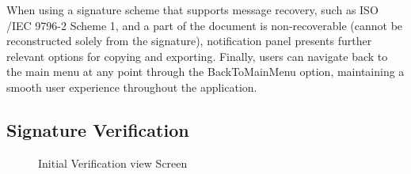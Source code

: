 \documentclass[]{final_report}
\theoremstyle{definition}
\begin{document}
When using a signature scheme that supports message recovery, such as ISO \slash IEC 9796-2 Scheme 1, and a part of the document is non-recoverable (cannot be reconstructed solely from the signature), notification panel presents further relevant options for copying and exporting.
Finally, users can navigate back to the main menu at any point through the BackToMainMenu option, maintaining a smooth user experience throughout the application.

\subsection{Signature Verification}

\begin{figure}[H]
    \centering %
    
    \begin{minipage}{0.49\textwidth}
        \centering
        \caption{Initial Verification view Screen}
        \label{fig:image1}
    \end{minipage}
    \hfill %
    \begin{minipage}{0.49\textwidth}
        \centering

\end{minipage}
\end{figure}
\end{document}
